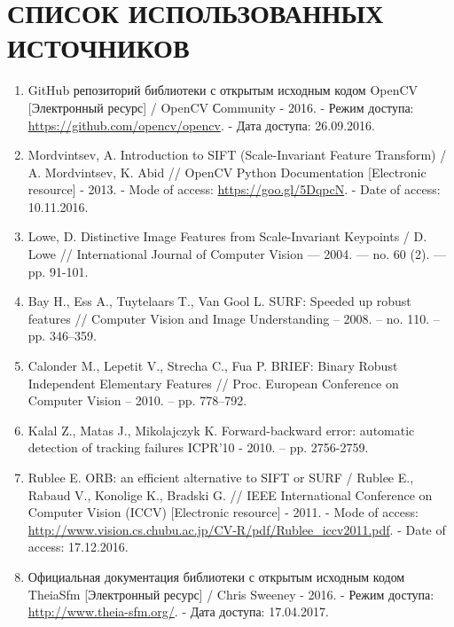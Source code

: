 \chapter*{СПИСОК ИСПОЛЬЗОВАННЫХ ИСТОЧНИКОВ}

\begin{enumerate}
    \item \label{itm:opencv} GitHub репозиторий библиотеки с открытым исходным кодом OpenCV [Электронный ресурс] / OpenCV Сommunity - 2016. - Режим доступа: \url{https://github.com/opencv/opencv}. - Дата доступа: 26.09.2016.

    \item \label{itm:sift} Mordvintsev, A. Introduction to SIFT (Scale-Invariant Feature Transform) / A. Mordvintsev, K. Abid // OpenCV Python Documentation [Electronic resource] - 2013. - Mode of access: \url{https://goo.gl/5DqpcN}. - Date of access: 10.11.2016.

    \item \label{itm:lowe} Lowe, D. Distinctive Image Features from Scale-Invariant Keypoints / D. Lowe // International Journal of Computer Vision — 2004. — no. 60 (2). — pp. 91-101.

    \item \label{itm:surf} Bay H., Ess A., Tuytelaars T., Van Gool L. SURF: Speeded up robust features // Computer Vision and Image Understanding – 2008. – no. 110. – pp. 346–359.

    \item \label{itm:brief} Calonder M., Lepetit V., Strecha C., Fua P. BRIEF: Binary Robust Independent Elementary Features // Proc. European Conference on Computer Vision – 2010. – pp. 778–792.

    \item \label{itm:gloh} Kalal Z., Matas J., Mikolajczyk K. Forward-backward error: automatic detection of tracking failures ICPR’10 - 2010. – pp. 2756-2759.

    \item \label{itm:orb} Rublee E. ORB: an efficient alternative to SIFT or SURF / Rublee E., Rabaud V., Konolige K., Bradski G. // IEEE International Conference on Computer Vision (ICCV) [Electronic resource] - 2011. - Mode of access: \url{http://www.vision.cs.chubu.ac.jp/CV-R/pdf/Rublee_iccv2011.pdf}. - Date of access: 17.12.2016.

    \item \label{itm:theia} Официальная документация библиотеки с открытым исходным кодом TheiaSfm [Электронный ресурс] / Chris Sweeney - 2016. - Режим доступа: \url{http://www.theia-sfm.org/}. - Дата доступа: 17.04.2017.


\end{enumerate}
